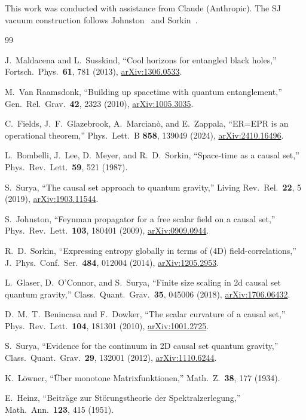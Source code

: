 \documentclass[aps,prd,twocolumn,superscriptaddress,nofootinbib]{revtex4-2}
\begin{document}
\begin{acknowledgments}
This work was conducted with assistance from Claude (Anthropic). The SJ vacuum construction follows Johnston~\cite{johnston2009} and Sorkin~\cite{sorkin2012}.
\end{acknowledgments}

\begin{thebibliography}{99}

J.~Maldacena and L.~Susskind,
``Cool horizons for entangled black holes,''
Fortsch.\ Phys.\ \textbf{61}, 781 (2013),
\href{https://arxiv.org/abs/1306.0533}{arXiv:1306.0533}.

M.~Van Raamsdonk,
``Building up spacetime with quantum entanglement,''
Gen.\ Rel.\ Grav.\ \textbf{42}, 2323 (2010),
\href{https://arxiv.org/abs/1005.3035}{arXiv:1005.3035}.

C.~Fields, J.~F.~Glazebrook, A.~Marcian\`o, and E.~Zappala,
``ER=EPR is an operational theorem,''
Phys.\ Lett.\ B \textbf{858}, 139049 (2024),
\href{https://arxiv.org/abs/2410.16496}{arXiv:2410.16496}.

L.~Bombelli, J.~Lee, D.~Meyer, and R.~D.~Sorkin,
``Space-time as a causal set,''
Phys.\ Rev.\ Lett.\ \textbf{59}, 521 (1987).

S.~Surya,
``The causal set approach to quantum gravity,''
Living Rev.\ Rel.\ \textbf{22}, 5 (2019),
\href{https://arxiv.org/abs/1903.11544}{arXiv:1903.11544}.

S.~Johnston,
``Feynman propagator for a free scalar field on a causal set,''
Phys.\ Rev.\ Lett.\ \textbf{103}, 180401 (2009),
\href{https://arxiv.org/abs/0909.0944}{arXiv:0909.0944}.

R.~D.~Sorkin,
``Expressing entropy globally in terms of (4D) field-correlations,''
J.\ Phys.\ Conf.\ Ser.\ \textbf{484}, 012004 (2014),
\href{https://arxiv.org/abs/1205.2953}{arXiv:1205.2953}.

L.~Glaser, D.~O'Connor, and S.~Surya,
``Finite size scaling in 2d causal set quantum gravity,''
Class.\ Quant.\ Grav.\ \textbf{35}, 045006 (2018),
\href{https://arxiv.org/abs/1706.06432}{arXiv:1706.06432}.

D.~M.~T.~Benincasa and F.~Dowker,
``The scalar curvature of a causal set,''
Phys.\ Rev.\ Lett.\ \textbf{104}, 181301 (2010),
\href{https://arxiv.org/abs/1001.2725}{arXiv:1001.2725}.

S.~Surya,
``Evidence for the continuum in 2D causal set quantum gravity,''
Class.\ Quant.\ Grav.\ \textbf{29}, 132001 (2012),
\href{https://arxiv.org/abs/1110.6244}{arXiv:1110.6244}.

K.~L\"owner,
``\"Uber monotone Matrixfunktionen,''
Math.\ Z.\ \textbf{38}, 177 (1934).

E.~Heinz,
``Beitr\"age zur St\"orungstheorie der Spektralzerlegung,''
Math.\ Ann.\ \textbf{123}, 415 (1951).

\end{thebibliography}
\end{document}
